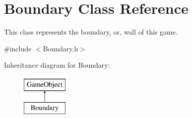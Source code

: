 \hypertarget{class_boundary}{}\section{Boundary Class Reference}
\label{class_boundary}


This class represents the boundary, or, wall of this game.  




{\ttfamily \#include $<$Boundary.\+h$>$}

Inheritance diagram for Boundary\+:\begin{figure}[H]
\begin{center}
\leavevmode
\includegraphics[height=2.000000cm]{class_boundary}
\end{center}
\end{figure}
